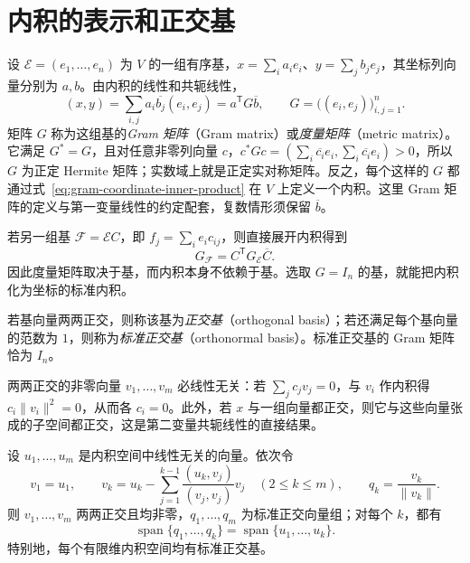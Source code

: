 \section{内积的表示和正交基}
\label{sec:gram-orthogonal-basis}

设 $\mathcal E=(e_1,\ldots,e_n)$ 为 $V$ 的一组有序基，$x=\sum_i a_ie_i$、$y=\sum_j b_je_j$，其坐标列向量分别为 $a,b$。由内积的线性和共轭线性，
\begin{equation}
\label{eq:gram-coordinate-inner-product}
    (x,y)=\sum_{i,j}a_i\overline{b_j}(e_i,e_j)
    =a^{\mathsf T}G\overline b,
    \qquad G=\bigl((e_i,e_j)\bigr)_{i,j=1}^n.
\end{equation}
矩阵 $G$ 称为这组基的\emph{Gram 矩阵}（Gram matrix）或\emph{度量矩阵}（metric matrix）。它满足 $G^*=G$，且对任意非零列向量 $c$，$c^*Gc=(\sum_i\overline{c_i}e_i,\sum_i\overline{c_i}e_i)>0$，所以 $G$ 为正定 Hermite 矩阵；实数域上就是正定实对称矩阵。反之，每个这样的 $G$ 都通过式~\eqref{eq:gram-coordinate-inner-product} 在 $V$ 上定义一个内积。这里 Gram 矩阵的定义与第一变量线性的约定配套，复数情形须保留 $\overline b$。

若另一组基 $\mathcal F=\mathcal E C$，即 $f_j=\sum_i e_ic_{ij}$，则直接展开内积得到
\[
    G_{\mathcal F}=C^{\mathsf T}G_{\mathcal E}\overline C.
\]
因此度量矩阵取决于基，而内积本身不依赖于基。选取 $G=I_n$ 的基，就能把内积化为坐标的标准内积。

\begin{definition}
若基向量两两正交，则称该基为\emph{正交基}（orthogonal basis）；若还满足每个基向量的范数为 $1$，则称为\emph{标准正交基}（orthonormal basis）。标准正交基的 Gram 矩阵恰为 $I_n$。
\end{definition}

两两正交的非零向量 $v_1,\ldots,v_m$ 必线性无关：若 $\sum_j c_jv_j=0$，与 $v_i$ 作内积得 $c_i\|v_i\|^2=0$，从而各 $c_i=0$。此外，若 $x$ 与一组向量都正交，则它与这些向量张成的子空间都正交，这是第二变量共轭线性的直接结果。

\begin{theorem}
\label{thm:gram-schmidt}
设 $u_1,\ldots,u_m$ 是内积空间中线性无关的向量。依次令
\begin{equation}
\label{eq:gram-schmidt}
    v_1=u_1,\qquad
    v_k=u_k-\sum_{j=1}^{k-1}\frac{(u_k,v_j)}{(v_j,v_j)}v_j
    \quad(2\leq k\leq m),
    \qquad q_k=\frac{v_k}{\|v_k\|}.
\end{equation}
则 $v_1,\ldots,v_m$ 两两正交且均非零，$q_1,\ldots,q_m$ 为标准正交向量组；对每个 $k$，都有
\[
    \operatorname{span}\{q_1,\ldots,q_k\}
    =\operatorname{span}\{u_1,\ldots,u_k\}.
\]
特别地，每个有限维内积空间均有标准正交基。
\end{theorem}

